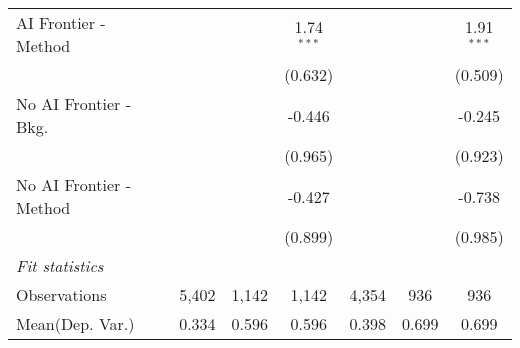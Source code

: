 \begin{tabular}{lcccccc}
   AI Frontier - Method    &               &              & 1.74$^{***}$ &               &             & 1.91$^{***}$\\   
                           &               &              & (0.632)      &               &             & (0.509)\\   
   No AI Frontier - Bkg.   &               &              & -0.446       &               &             & -0.245\\   
                           &               &              & (0.965)      &               &             & (0.923)\\   
   No AI Frontier - Method &               &              & -0.427       &               &             & -0.738\\   
                           &               &              & (0.899)      &               &             & (0.985)\\   
   \midrule
   \emph{Fit statistics}\\
   Observations            & 5,402         & 1,142        & 1,142        & 4,354         & 936         & 936\\  
Mean(Dep. Var.) & 0.334 & 0.596 & 0.596 & 0.398 & 0.699 & 0.699 \\
   

\end{tabular}
